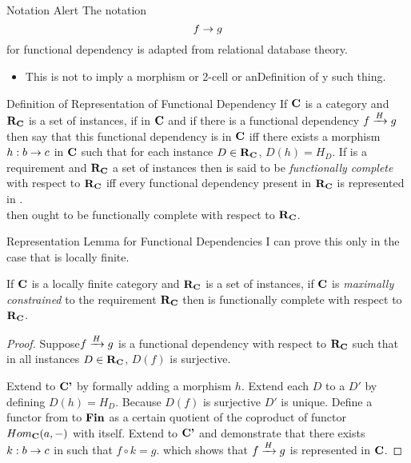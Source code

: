 \begin{frame}{Notation Alert}
The notation 
$$
f \morph g
$$
for functional dependency is adapted from relational database theory. 

\begin{itemize}
\item This is not to imply a morphism or 2-cell or anDefinition of y such thing.
\end{itemize}
\end{frame}

\begin{frame}{Definition of Representation of Functional Dependency}
If $\catc$ is a category and $\reqtc$ is a set of instances, 
if \fgsourcediagram in $\catc$ 
and if there is a functional dependency $\fundep{H}{f}{g}$ then say that 
this functional dependency  is  in $\catc$ 
iff there exists a morphism $h:b \morph c$ in $\catc$ such that for each instance $D \in \reqtc$, $D(h)=H_D$.
\medskip
\pause If \catcw is a requirement and $\reqtc$ a set of instances then \catcw is said to be 
\textit{functionally complete} with respect to $\reqtc$ iff every functional dependency
present in $\reqtc$ is represented in \catc.\\
\medskip
\pause {}\IfSforCwithRCwords then \catcw ought to be functionally complete with respect to $\reqtc$.
\end{frame}

\begin{frame}{Representation Lemma for Functional Dependencies}
I can prove this only in the case that \catcw is locally finite.

\begin{lemma}
If $\catc$ is a locally finite category and $\reqtc$ is a set of instances, if $\catc$ is 
\textit{maximally constrained} to the requirement $\reqtc$ then 
\catcw is functionally complete with respect to $\reqtc$.
\end{lemma}
\begin{proof}
Suppose$\fundep{H}{f}{g}$  is a functional dependency with respect to $\reqtc$
such that in all instances $D \in \reqtc$, $D(f)$ is surjective.

Extend \catcw to $\catcp$ by formally adding a morphism $h$. Extend each $D$ to a $D'$ by defining $D(h)=H_D$. 
Because $D(f)$ is surjective $D'$ is unique. 
Define a functor from \catcw to $\Fin$ as  a certain quotient of the coproduct of functor $Hom_{\catc}(a,-)$ with itself. 
Extend to $\catcp$ and demonstrate that there exists $k:b \morph c$ in \catcw such that $f \circ k=g$. 
which shows that $\fundep{H}{f}{g}$ is represented in $\catc$.
\end{proof}
\end{frame}

